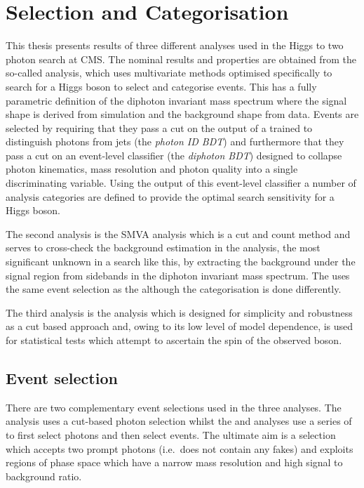 \chapter{Selection and Categorisation}
\label{chap:selection_and_categorisation}

This thesis presents results of three different analyses used in the Higgs to two photon search at CMS. The nominal results and properties are obtained from the so-called \MFM analysis, which uses multivariate methods optimised specifically to search for a \SM Higgs boson to select and categorise events. This has a fully parametric definition of the diphoton invariant mass spectrum where the signal shape is derived from \MC simulation and the background shape from data. Events are selected by requiring that they pass a cut on the output of a \BDT trained to distinguish photons from jets (the \textit{photon ID BDT}) and furthermore that they pass a cut on an event-level classifier (the \textit{diphoton BDT}) designed to collapse photon kinematics, mass resolution and photon quality into a single discriminating variable. Using the output of this event-level classifier a number of analysis categories are defined to provide the optimal search sensitivity for a \SM Higgs boson. 

The second analysis is the \acf{SMVA} analysis which is a cut and count method and serves to cross-check the background estimation in the \MFM analysis, the most significant unknown in a search like this, by extracting the background under the signal region from sidebands in the diphoton invariant mass spectrum. The \SMVA uses the same event selection as the \MFM although the categorisation is done differently. 

The third analysis is the \CiC analysis which is designed for simplicity and robustness as a cut based approach and, owing to its low level of model dependence, is used for statistical tests which attempt to ascertain the spin of the observed boson.

\section{Event selection}
\label{sec:event_selection}

There are two complementary event selections used in the three analyses. The \CiC analysis uses a cut-based photon selection whilst the \MFM and \SMVA analyses use a series of \BDTs to first select photons and then select events. The ultimate aim is a selection which accepts two prompt photons (i.e.\ does not contain any fakes) and exploits regions of phase space which have a narrow mass resolution and high signal to background ratio.

